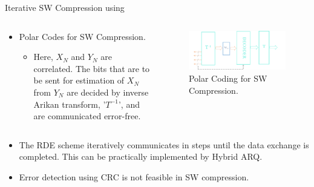 \documentclass[final,hyperref={pdfpagelabels=false}]{beamer}
\begin{document}
\begin{frame}[t]
\begin{columns}[t]
\begin{column}{.465\textwidth}
\begin{block}{Iterative SW Compression using }
\begin{columns} %
\begin{column}{.5\textwidth} %
\begin{itemize}
\item Polar Codes for SW Compression.
\begin{itemize}
\item Here, $X_{N}$ and $Y_{N}$ are correlated. The bits that are to be sent for estimation of $X_{N}$ from $Y_{N}$ are decided by inverse Arikan transform, '$T^{-1}$', and are communicated error-free.
\end{itemize}
\end{itemize}
\end{column}
\begin{column}{.43\textwidth} 
\begin{figure}
\includegraphics[width=1\linewidth]{psw.png}
\caption{Polar Coding for SW Compression.}
\end{figure}
\end{column}
\end{columns} %
\begin{itemize}
\item The RDE scheme iteratively communicates in steps until the data exchange is completed. This can be practically implemented by Hybrid ARQ.
\item Error detection using CRC is not feasible in SW compression.

\end{itemize}

\end{block}



\end{column}
\end{columns}
\end{frame}
\end{document}
